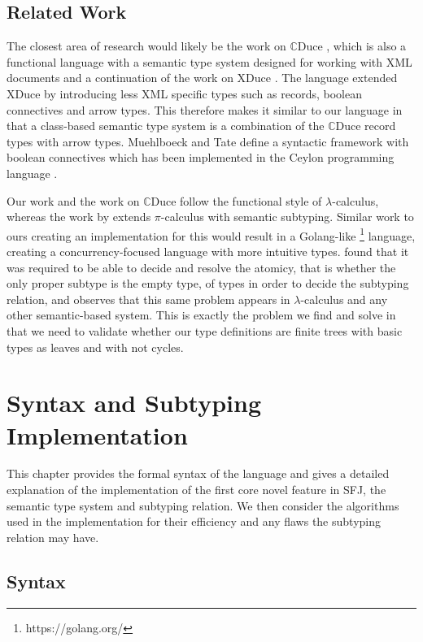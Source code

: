 \documentclass{l4proj}
\begin{document}
\section{Related Work}
The closest area of research would likely be the work on $\mathbb{C}$Duce
\citep{Benzaken2003}, which is also a functional language with a semantic type system designed for
working with XML documents and a continuation of the work on XDuce \citep{Hosoya2003}.
The language extended XDuce by introducing less XML specific types such as records, boolean connectives and arrow types.
This therefore makes it similar to our language in that a class-based semantic type system is a combination of the $\mathbb{C}$Duce record types with arrow types.
Muehlboeck and Tate \cite{Muehlboeck2018} define a syntactic framework with boolean connectives which has been implemented in the Ceylon programming language \citep{Ceylon2016}.

Our work and the work on $\mathbb{C}$Duce follow the functional style of $\lambda$-calculus, whereas the work by \citet{Castagna2008} extends $\pi$-calculus with semantic subtyping.
Similar work to ours creating an implementation for this would result in a Golang-like \footnote{https://golang.org/} language, creating a concurrency-focused language with more
intuitive types.
\citet{Castagna2008} found that it was required to be able to decide and resolve the atomicy, that is whether the only proper subtype is the empty type, of types in order to decide the subtyping relation, and observes that this same problem appears in $\lambda$-calculus and any other semantic-based system.
This is exactly the problem we find and solve in that we need to validate whether our type definitions are finite trees with basic types as leaves and with not cycles.


\chapter{Syntax and Subtyping Implementation}

This chapter provides the formal syntax of the language and gives a detailed explanation of the implementation of the first core novel feature in SFJ, the semantic type system and subtyping relation.
We then consider the algorithms used in the implementation for their efficiency and any flaws the subtyping relation may have.

\section{Syntax}
\label{sec:syntax}
\end{document}
